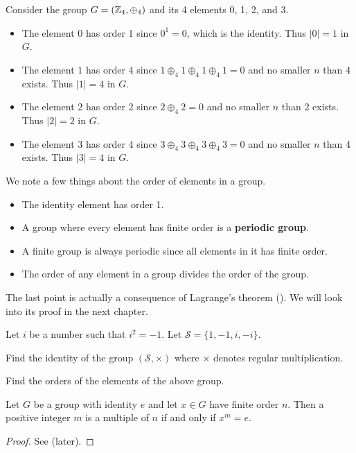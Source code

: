 \begin{example}
    Consider the group $G = (\mathbb{Z}_4, \oplus_4)$ and its 4 elements 0, 1, 2, and 3.
    \begin{itemize}
        \item The element $0$ has order 1 since $0^1 = 0$, which is the identity. Thus $|0| = 1$ in $G$.
        \item The element $1$ has order 4 since $1 \oplus_4 1 \oplus_4 1 \oplus_4 1 = 0$ and no smaller $n$ than 4 exists. Thus $|1| = 4$ in $G$.
        \item The element $2$ has order 2 since $2 \oplus_4 2 = 0$ and no smaller $n$ than 2 exists. Thus $|2| = 2$ in $G$.
        \item The element $3$ has order 4 since $3 \oplus_4 3 \oplus_4 3 \oplus_4 3 = 0$ and no smaller $n$ than 4 exists. Thus $|3| = 4$ in $G$.
    \end{itemize}
\end{example}

We note a few things about the order of elements in a group.
\begin{itemize}
    \item The identity element has order 1.
    \item A group where every element has finite order is a \textbf{periodic group}.
    \item A finite group is always periodic since all elements in it has finite order.
    \item The order of any element in a group divides the order of the group.
\end{itemize}
The last point is actually a consequence of Lagrange's theorem (). We will look into its proof in the next chapter.

\begin{exercise}
    Let $i$ be a number such that $i^2 = -1$. Let $\mathcal{S} = \{1, -1, i, -i\}$.
    \begin{partquestions}{\roman*}
        \item Find the identity of the group $(\mathcal{S}, \times)$ where $\times$ denotes regular multiplication.
        \item Find the orders of the elements of the above group.
    \end{partquestions}
\end{exercise}

\begin{lemma}\label{lemma-order-of-an-element-that-is-equivalent-to-identity}
    Let $G$ be a group with identity $e$ and let $x \in G$ have finite order $n$. Then a positive integer $m$ is a multiple of $n$ if and only if $x^m = e$.
\end{lemma}
\begin{proof}
    See  (later).
\end{proof}

